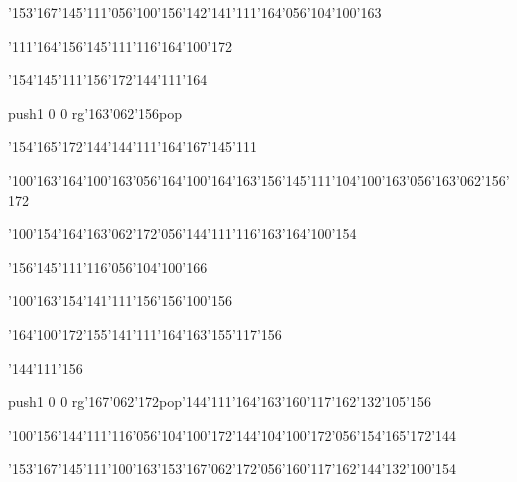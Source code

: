 \null\vfill\ipa\centerline{\enskip\enskip\enskip\enskip\char'153\char'167\char'145\char'111\char'056\char'100\char'156\enskip\char'142\char'141\char'111\char'164\char'056\char'104\char'100\char'163}\medskip\centerline{\enskip\char'111\char'164\enskip\char'156\char'145\char'111\char'116\enskip\enskip\enskip\enskip\char'164\char'100\char'172}\medskip\centerline{\enskip\enskip\enskip\enskip\enskip\enskip\char'154\char'145\char'111\char'156\char'172\enskip\enskip\enskip\enskip\char'144\char'111\char'164}\medskip\centerline{\enskip\enskip\enskip\enskip\enskip\enskip\enskip\enskip\enskip\enskip\enskip\pdfcolorstack\match push{1 0 0 rg}\char'163\char'062\char'156\pdfcolorstack\match pop{}}\medskip\centerline{\enskip\enskip\enskip\enskip\enskip\char'154\char'165\char'172\char'144\enskip\enskip\char'144\char'111\char'164\enskip\char'167\char'145\char'111\enskip\enskip\enskip\enskip\enskip\enskip}\medskip\centerline{\enskip\char'100\char'163\enskip\char'164\char'100\char'163\char'056\char'164\char'100\char'164\char'163\enskip\char'156\char'145\char'111\enskip\char'104\char'100\char'163\char'056\char'163\char'062\char'156\char'172}\medskip\centerline{\enskip\enskip\enskip\enskip\enskip\enskip\enskip\enskip\char'100\char'154\enskip\enskip\enskip\char'164\char'163\char'062\char'172\char'056\char'144\char'111\char'116\enskip\char'163\char'164\char'100\char'154}\medskip\vfill\footline{\hfil\tt\folio\hfil}\eject
\null\vfill\ipa\centerline{\enskip\enskip\enskip\enskip\enskip\enskip\enskip\enskip\enskip\enskip\enskip\char'156\char'145\char'111\char'116\char'056\char'104\char'100\char'166}\medskip\centerline{\enskip\char'100\char'163\enskip\char'154\char'141\char'111\char'156\enskip\char'156\char'100\char'156\enskip\enskip\enskip\enskip}\medskip\centerline{\enskip\enskip\char'164\char'100\char'172\enskip\enskip\char'155\char'141\char'111\char'164\char'163\enskip\enskip\enskip\enskip\char'155\char'117\char'156}\medskip\centerline{\enskip\enskip\enskip\enskip\enskip\enskip\enskip\enskip\enskip\enskip\enskip\char'144\char'111\char'156}\medskip\centerline{\enskip\pdfcolorstack\match push{1 0 0 rg}\char'167\char'062\char'172\pdfcolorstack\match pop{}\enskip\char'144\char'111\char'164\char'163\enskip\enskip\char'160\char'117\char'162\enskip\enskip\enskip\enskip\enskip\enskip\enskip\char'132\char'105\char'156}\medskip\centerline{\enskip\char'100\char'156\enskip\char'144\char'111\char'116\char'056\char'104\char'100\char'172\char'144\enskip\enskip\enskip\enskip\enskip\char'104\char'100\char'172\char'056\char'154\char'165\char'172\char'144}\medskip\centerline{\enskip\char'153\char'167\char'145\char'111\enskip\enskip\enskip\enskip\char'100\char'163\enskip\enskip\enskip\char'153\char'167\char'062\char'172\char'056\char'160\char'117\char'162\enskip\char'144\char'132\char'100\char'154}\medskip\vfill\footline{\hfil\tt\folio\hfil}\eject
